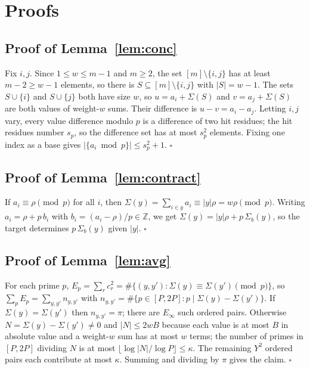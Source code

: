 \documentclass[conference]{IEEEtran}
\begin{document}
\appendices
\section{Proofs}\label{app:proofs}
\subsection{Proof of Lemma~\ref{lem:conc}}
Fix $i,j$. Since $1\le w\le m-1$ and $m\ge2$, the set $[m]\setminus\{i,j\}$ has at
least $m-2\ge w-1$ elements, so there is $S\subseteq[m]\setminus\{i,j\}$ with
$|S|=w-1$. The sets $S\cup\{i\}$ and $S\cup\{j\}$ both have size $w$, so
$u=a_i+\Sigma(S)$ and $v=a_j+\Sigma(S)$ are both values of weight-$w$ sums. Their
difference is $u-v=a_i-a_j$. Letting $i,j$ vary, every value difference modulo
$p$ is a difference of two hit residues; the hit residues number $s_p$, so the
difference set has at most $s_p^2$ elements. Fixing one index as a base gives
$|\{a_i\bmod p\}|\le s_p^2+1$. \hfill$\square$

\subsection{Proof of Lemma~\ref{lem:contract}}
If $a_i\equiv\rho\pmod p$ for all $i$, then
$\Sigma(y)=\sum_{i\in y}a_i\equiv|y|\rho=w\rho\pmod p$. Writing
$a_i=\rho+p\,b_i$ with $b_i=(a_i-\rho)/p\in\mathbb Z$, we get
$\Sigma(y)=|y|\rho+p\,\Sigma_b(y)$, so the target determines $p\,\Sigma_b(y)$ given
$|y|$. \hfill$\square$

\subsection{Proof of Lemma~\ref{lem:avg}}
For each prime $p$, $E_p=\sum_r c_r^2=\#\{(y,y'):\Sigma(y)\equiv\Sigma(y')\pmod p\}$,
so $\sum_pE_p=\sum_{y,y'}n_{y,y'}$ with
$n_{y,y'}=\#\{p\in[P,2P]:p\mid\Sigma(y)-\Sigma(y')\}$. If $\Sigma(y)=\Sigma(y')$
then $n_{y,y'}=\pi$; there are $E_\infty$ such ordered pairs. Otherwise
$N=\Sigma(y)-\Sigma(y')\ne0$ and $|N|\le2wB$ because each value is at most $B$ in
absolute value and a weight-$w$ sum has at most $w$ terms; the number of primes in
$[P,2P]$ dividing $N$ is at most $\lfloor\log|N|/\log P\rfloor\le\kappa$. The
remaining $Y^2$ ordered pairs each contribute at most $\kappa$. Summing and
dividing by $\pi$ gives the claim. \hfill$\square$
\end{document}
